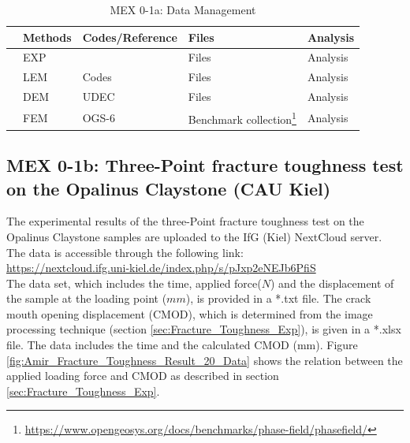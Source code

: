 
\begin{table}[h!]
\footnotesize
\centering
\caption{MEX 0-1a: Data Management}
\label{tab:schedule}
\begin{tabular}{|L{0.5cm}|L{1cm}|L{2cm}|L{3cm}|L{1cm}|} 
\hline
 & Methods & Codes/Reference & Files & Analysis \\ \hline
 & EXP & \cite{} & Files & Analysis \\ \hline
 & LEM & Codes & Files & Analysis \\ \hline
 & DEM & UDEC & Files & Analysis \\ \hline
 & FEM & OGS-6 & Benchmark collection\footnote{\url{https://www.opengeosys.org/docs/benchmarks/phase-field/phasefield/}} & Analysis \\ \hline
\end{tabular}
\end{table}
\normalsize

\subsection{MEX 0-1b: Three-Point fracture toughness test on the Opalinus Claystone (CAU Kiel)}

The experimental results of the three-Point fracture toughness test on the Opalinus Claystone samples are uploaded to the IfG (Kiel) NextCloud server. The data is accessible through the following link:\\
\hyperlink{https://nextcloud.ifg.uni-kiel.de/index.php/s/pJxp2eNEJb6PfiS}{https://nextcloud.ifg.uni-kiel.de/index.php/s/pJxp2eNEJb6PfiS}\\

The data set, which includes the time, applied force($N$) and the displacement of the sample at the loading point ($mm$), is provided in a *.txt file. The crack mouth opening displacement (CMOD), which is determined from the image processing technique (section \ref {sec:Fracture_Toughness_Exp}), is given in a *.xlsx file. The data includes the time and the calculated CMOD (mm). Figure \ref{fig:Amir_Fracture_Toughness_Result_20_Data} shows the relation between the applied loading force and CMOD as described in section \ref {sec:Fracture_Toughness_Exp}.

